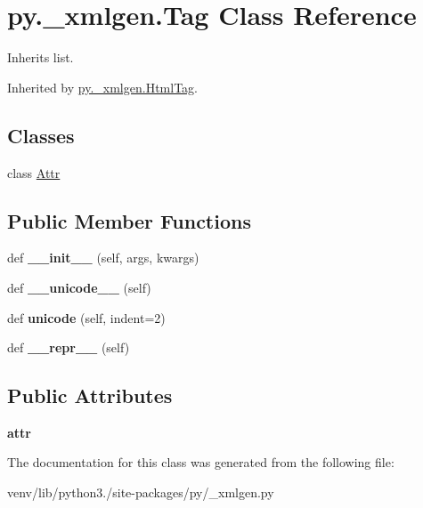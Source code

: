 \hypertarget{classpy_1_1__xmlgen_1_1_tag}{}\section{py.\+\_\+xmlgen.\+Tag Class Reference}
\label{classpy_1_1__xmlgen_1_1_tag}


Inherits list.



Inherited by \hyperlink{classpy_1_1__xmlgen_1_1_html_tag}{py.\+\_\+xmlgen.\+Html\+Tag}.

\subsection*{Classes}
\begin{DoxyCompactItemize}
\item 
class \hyperlink{classpy_1_1__xmlgen_1_1_tag_1_1_attr}{Attr}
\end{DoxyCompactItemize}
\subsection*{Public Member Functions}
\begin{DoxyCompactItemize}
\item 
\mbox{\label{classpy_1_1__xmlgen_1_1_tag_ac3608a8226c2a2bc4aaf3561ebdaac92}} 
def {\bfseries \+\_\+\+\_\+init\+\_\+\+\_\+} (self, args, kwargs)
\item 
\mbox{\label{classpy_1_1__xmlgen_1_1_tag_a2babda065889a2a77c8941c2941e6f2e}} 
def {\bfseries \+\_\+\+\_\+unicode\+\_\+\+\_\+} (self)
\item 
\mbox{\label{classpy_1_1__xmlgen_1_1_tag_a52efa6938d1acba088ee31d4e306eb3b}} 
def {\bfseries unicode} (self, indent=2)
\item 
\mbox{\label{classpy_1_1__xmlgen_1_1_tag_add0d8aec7b27320b25b0b10be398b1e8}} 
def {\bfseries \+\_\+\+\_\+repr\+\_\+\+\_\+} (self)
\end{DoxyCompactItemize}
\subsection*{Public Attributes}
\begin{DoxyCompactItemize}
\item 
\mbox{\label{classpy_1_1__xmlgen_1_1_tag_ac6427201b465bfd8587877f4b826689c}} 
{\bfseries attr}
\end{DoxyCompactItemize}


The documentation for this class was generated from the following file\+:\begin{DoxyCompactItemize}
\item 
venv/lib/python3./site-\/packages/py/\+\_\+xmlgen.\+py\end{DoxyCompactItemize}
